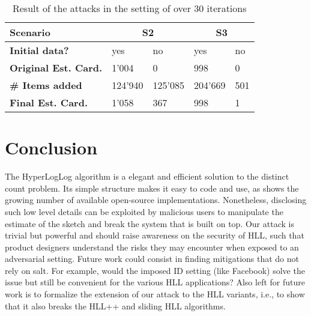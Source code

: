 \documentclass{IEEEtran}
\begin{document}
\begin{table}[h]
\caption{Result of the attacks in the setting of \cite{hllvuln} over 30 iterations}
\begin{tabular}{| m{8.5em} | m{4em} | m{4em} | m{4em} | m{4em} |}
    \hline
    \textbf{Scenario} & \multicolumn{2}{c|}{S2} & \multicolumn{2}{c|}{S3} \\ \hline
    \textbf{Initial data?} & yes & no & yes & no \\ \hline
    \textbf{Original Est. Card.} & 1'004 & 0 & 998 & 0 \\ \hline
    \textbf{\# Items added} & 124'940 & 125'085 & 204'669 & 501 \\ \hline
    \textbf{Final Est. Card.} & 1'058 & 367 & 998 & 1 \\ \hline
\end{tabular}
\label{table:tab2}
\end{table}

\section{Conclusion}
The HyperLogLog algorithm is a elegant and efficient solution to the distinct count problem. Its simple structure makes it easy to code and use, as shows the growing number of available open-source implementations. Nonetheless, disclosing such low level details can be exploited by malicious users to manipulate the estimate of the sketch and break the system that is built on top. Our attack is trivial but powerful and should raise awareness on the security of HLL, such that product designers understand the risks they may encounter when exposed to an adversarial setting. Future work could consist in finding mitigations that do not rely on salt. For example, would the imposed ID setting (like Facebook) solve the issue but still be convenient for the various HLL applications? Also left for future work is to formalize the extension of our attack to the HLL variants, i.e., to show that it also breaks the HLL++ \cite{hllpratice} and sliding HLL \cite{slidinghll} algorithms.



\end{document}
